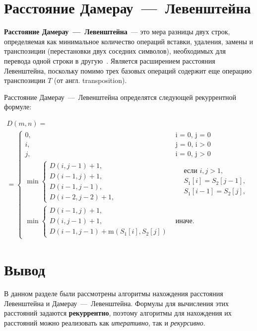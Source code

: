 \section{Расстояние Дамерау~---~Левенштейна}

\textbf{Расстояние Дамерау~---~Левенштейна}~--- это мера разницы двух строк, определяемая как минимальное количество операций вставки, удаления, замены и транспозиции (перестановки двух соседних символов), необходимых для перевода одной строки в другую~\cite{analysis-lev-damlev}. Является расширением расстояния Левенштейна, поскольку помимо трех базовых операций содержит еще операцию транспозиции $T$ (от англ. transposition).

Расстояние Дамерау~---~Левенштейна определятся следующей рекуррентной формуле:

\begin{multline}
    D(m, n) =\\ =
    \begin{cases}
        0, &\text{i = 0, j = 0}\\
        i, &\text{j = 0, i > 0}\\
        j, &\text{i = 0, j > 0}\\
        \min
        \begin{cases}
            D(i, j - 1) + 1,\\
            D(i - 1, j) + 1,\\
            D(i - 1, j - 1),\\
            D(i - 2, j - 2) + 1,
        \end{cases} 
        &\begin{aligned}
            & \text{если $i, j > 1$}, \\
            & S_{1}[i] = S_{2}[j - 1], \\
            & S_{1}[i - 1] = S_{2}[j],
        \end{aligned} \\
        \min
        \begin{cases}
            D(i - 1, j) + 1, \\
            D(i, j - 1) + 1, \\
            D(i - 1, j - 1) + \text{m}(S_1[i], S_2[j])
        \end{cases} &\text{иначе.}
    \end{cases}
    \label{eqn:recur-damlev}
\end{multline}

\section*{Вывод}
В данном разделе были рассмотрены алгоритмы нахождения расстояния Левенштейна и Дамерау~---~Левенштейна.
Формулы для вычисления этих расстояний задаются \textbf{рекуррентно}, поэтому алгоритмы для нахождения их расстояний можно реализовать как \textit{итеративно}, так и \textit{рекурсивно}.
